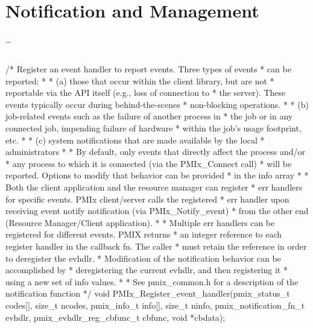\section{Notification and Management}
\label{chap:api_event:notify}

\ldots


\subsection{}

\cspecificstart
\begin{codepar}
/* Register an event handler to report events. Three types of events
 * can be reported:
 *
 * (a) those that occur within the client library, but are not
 *     reportable via the API itself (e.g., loss of connection to
 *     the server). These events typically occur during behind-the-scenes
 *     non-blocking operations.
 *
 * (b) job-related events such as the failure of another process in
 *     the job or in any connected job, impending failure of hardware
 *     within the job's usage footprint, etc.
 *
 * (c) system notifications that are made available by the local
 *     administrators
 *
 * By default, only events that directly affect the process and/or
 * any process to which it is connected (via the PMIx_Connect call)
 * will be reported. Options to modify that behavior can be provided
 * in the info array
 *
 * Both the client application and the resource manager can register
 * err handlers for specific events. PMIx client/server calls the registered
 * err handler upon receiving event notify notification (via PMIx_Notify_event)
 * from the other end (Resource Manager/Client application).
 *
 * Multiple err handlers can be registered for different events. PMIX returns
 * an integer reference to each register handler in the callback fn. The caller
 * must retain the reference in order to deregister the evhdlr.
 * Modification of the notification behavior can be accomplished by
 * deregistering the current evhdlr, and then registering it
 * using a new set of info values.
 *
 * See pmix_common.h for a description of the notification function */
void
PMIx_Register_event_handler(pmix_status_t codes[], size_t ncodes,
                            pmix_info_t info[], size_t ninfo,
                            pmix_notification_fn_t evhdlr,
                            pmix_evhdlr_reg_cbfunc_t cbfunc,
                            void *cbdata);
\end{codepar}
\cspecificend



